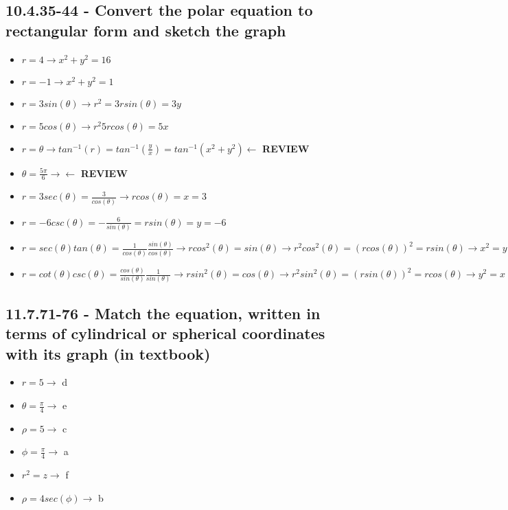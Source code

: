 \documentclass{article}
\begin{document}
\subsection{10.4.35-44 - Convert the polar equation to rectangular form and sketch the graph}
\begin{itemize}
    \item $r = 4 \rightarrow x^{2} + y^{2} = 16$
    \item $r = -1 \rightarrow x^{2} + y^{2} = 1$
    \item $r = 3sin(\theta) \rightarrow r^{2} = 3rsin(\theta) = 3y$
    \item $r = 5cos(\theta) \rightarrow r^{2} 5rcos(\theta) = 5x$
    \item $r = \theta \rightarrow tan^{-1}(r) = tan^{-1}(\frac{y}{x}) = tan^{-1}(x^{2} + y^{2}) \leftarrow$ \textbf{REVIEW}
    \item $\theta = \frac{5\pi}{6} \rightarrow \leftarrow$ \textbf{REVIEW}
    \item $r = 3sec(\theta) = \frac{3}{cos(\theta)} \rightarrow rcos(\theta) = x = 3$
    \item $r = -6csc(\theta) = -\frac{6}{sin(\theta)} = rsin(\theta) = y = -6$
    \item $r = sec(\theta)tan(\theta) = \frac{1}{cos(\theta)}\frac{sin(\theta)}{cos(\theta)} \rightarrow rcos^{2}(\theta) = sin(\theta) \rightarrow r^{2}cos^{2}(\theta) = (rcos(\theta))^{2} = rsin(\theta) \rightarrow x^{2} = y$ 
    \item $r = cot(\theta)csc(\theta) = \frac{cos(\theta)}{sin(\theta)}\frac{1}{sin(\theta)} \rightarrow rsin^{2}(\theta) = cos(\theta) \rightarrow r^{2}sin^{2}(\theta) = (rsin(\theta))^{2} = rcos(\theta) \rightarrow y^{2} = x$
\end{itemize}

\subsection{11.7.71-76 - Match the equation, written in terms of cylindrical or spherical coordinates with its graph (in textbook)}
\begin{itemize}
    \item $r = 5 \rightarrow$ d
    \item $\theta = \frac{\pi}{4} \rightarrow$ e
    \item $\rho = 5 \rightarrow$ c
    \item $\phi = \frac{\pi}{4} \rightarrow$ a
    \item $r^{2} = z \rightarrow$ f
    \item $\rho = 4sec(\phi) \rightarrow$ b
\end{itemize}
\end{document}
